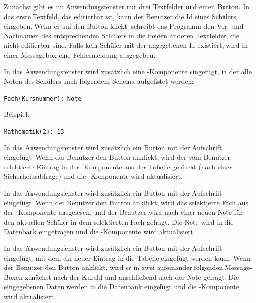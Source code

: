 \begin{compactenum}[a)]
\item Zunächst gibt es im Anwendungsfenster nur drei Textfelder und einen
Button. In das erste Textfeld, das editierbar ist, kann der Benutzer die Id
eines Schülers eingeben. Wenn er auf den Button klickt, schreibt das Programm
den Vor- und Nachnamen des entsprechenden Schülers in die beiden anderen
Textfelder, die nicht editierbar sind. Falls kein Schüler mit der angegebenen
Id existiert, wird in einer Messagebox eine Fehlermeldung ausgegeben.

\item In das Anwendungsfenster wird zusätzlich eine
-Komponente eingefügt, in der alle Noten des Schülers nach
folgendem Schema aufgelistet werden:

\lstinline|Fach(Kursnummer): Note|

Beispiel:

\lstinline|Mathematik(2): 13|

\item In das Anwendungsfenster wird zusätzlich ein Button mit der Aufschrift
 eingefügt. Wenn der Benutzer den Button anklickt, wird der
vom Benutzer selektierte Eintrag in der -Komponente aus der
Tabelle  gelöscht (nach einer Sicherheitsabfrage) und die
-Komponente wird aktualisiert.

\item In das Anwendungsfenster wird zusätzlich ein Button mit der Aufschrift
 eingefügt. Wenn der Benutzer den Button anklickt, wird
das selektierte Fach aus der -Komponente ausgelesen, und der
Benutzer wird nach einer neuen Note für den aktuellen Schüler in dem
selektierten Fach gefragt. Die Note wird in die Datenbank eingetragen und die
-Komponente wird aktualisiert.

\item In das Anwendungsfenster wird zusätzlich ein Button mit der Aufschrift
 eingefügt, mit dem ein neuer Eintrag in die Tabelle
 eingefügt werden kann. Wenn der Benutzer den Button anklickt,
wird er in zwei aufeinander folgenden Message-Boxen zunächst nach der KursId und
anschließend nach der Note gefragt. Die eingegebenen Daten werden in die
Datenbank eingefügt und die -Komponente wird aktualisiert.
\end{compactenum}


